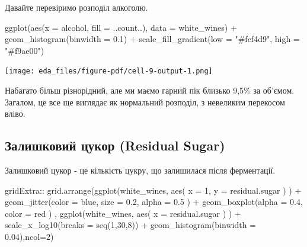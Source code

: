 \documentclass[
  letterpaper,
  DIV=11,
  numbers=noendperiod]{scrreprt}
\newenvironment{Shaded}{\begin{snugshade}}{\end{snugshade}}
\newcommand{\AttributeTok}[1]{\textcolor[rgb]{0.40,0.45,0.13}{#1}}
\newcommand{\DecValTok}[1]{\textcolor[rgb]{0.68,0.00,0.00}{#1}}
\newcommand{\FloatTok}[1]{\textcolor[rgb]{0.68,0.00,0.00}{#1}}
\newcommand{\FunctionTok}[1]{\textcolor[rgb]{0.28,0.35,0.67}{#1}}
\newcommand{\NormalTok}[1]{\textcolor[rgb]{0.00,0.23,0.31}{#1}}
\newcommand{\SpecialCharTok}[1]{\textcolor[rgb]{0.37,0.37,0.37}{#1}}
\newcommand{\StringTok}[1]{\textcolor[rgb]{0.13,0.47,0.30}{#1}}
\begin{document}
Давайте перевіримо розподіл алкоголю.

\begin{Shaded}
\begin{Highlighting}[]
\FunctionTok{ggplot}\NormalTok{(}\FunctionTok{aes}\NormalTok{(}\AttributeTok{x =}\NormalTok{ alcohol, }\AttributeTok{fill =}\NormalTok{ ..count..), }\AttributeTok{data =}\NormalTok{ white\_wines) }\SpecialCharTok{+}
  \FunctionTok{geom\_histogram}\NormalTok{(}\AttributeTok{binwidth =} \FloatTok{0.1}\NormalTok{) }\SpecialCharTok{+}
  \FunctionTok{scale\_fill\_gradient}\NormalTok{(}\AttributeTok{low =} \StringTok{"\#fcf4d9"}\NormalTok{, }\AttributeTok{high =} \StringTok{"\#f9ae00"}\NormalTok{)}
\end{Highlighting}
\end{Shaded}

\texttt{[image: eda\_files/figure-pdf/cell-9-output-1.png]}

Набагато більш різнорідний, але ми маємо гарний пік близько 9,5\% за
об'ємом. Загалом, це все ще виглядає як нормальний розподіл, з невеликим
перекосом вліво.

\subsection{Залишковий цукор (Residual
Sugar)}\label{ux437ux430ux43bux438ux448ux43aux43eux432ux438ux439-ux446ux443ux43aux43eux440-residual-sugar}

Залишковий цукор - це кількість цукру, що залишилася після ферментації.

\begin{Shaded}
\begin{Highlighting}[]
\NormalTok{gridExtra}\SpecialCharTok{::} \FunctionTok{grid.arrange}\NormalTok{(}\FunctionTok{ggplot}\NormalTok{(white\_wines, }\FunctionTok{aes}\NormalTok{( }\AttributeTok{x =} \DecValTok{1}\NormalTok{, }\AttributeTok{y =}\NormalTok{ residual.sugar ) ) }\SpecialCharTok{+} 
               \FunctionTok{geom\_jitter}\NormalTok{(}\AttributeTok{color =} \StringTok{\textquotesingle{}blue\textquotesingle{}}\NormalTok{, }\AttributeTok{size =} \FloatTok{0.2}\NormalTok{, }\AttributeTok{alpha =} \FloatTok{0.5}\NormalTok{ ) }\SpecialCharTok{+}
               \FunctionTok{geom\_boxplot}\NormalTok{(}\AttributeTok{alpha =} \FloatTok{0.4}\NormalTok{, }\AttributeTok{color =} \StringTok{\textquotesingle{}red\textquotesingle{}}\NormalTok{ ) ,}
             \FunctionTok{ggplot}\NormalTok{(white\_wines, }\FunctionTok{aes}\NormalTok{( }\AttributeTok{x   =}\NormalTok{ residual.sugar  ) ) }\SpecialCharTok{+} \FunctionTok{scale\_x\_log10}\NormalTok{(}\AttributeTok{breaks =} \FunctionTok{seq}\NormalTok{(}\DecValTok{1}\NormalTok{,}\DecValTok{30}\NormalTok{,}\DecValTok{8}\NormalTok{)) }\SpecialCharTok{+}
                   \FunctionTok{geom\_histogram}\NormalTok{(}\AttributeTok{binwidth =} \FloatTok{0.04}\NormalTok{),}\AttributeTok{ncol=}\DecValTok{2}\NormalTok{)}
\end{Highlighting}
\end{Shaded}
\end{document}
